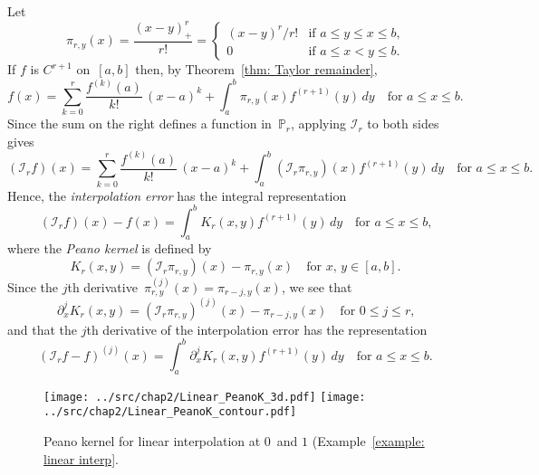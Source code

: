 Let 
\begin{equation}\label{eq: pi r y}
\pi_{r,y}(x)=\frac{(x-y)_+^r}{r!}=\begin{cases}
	(x-y)^r/r!&\text{if $a\le y\le x\le b$,}\\
	0&\text{if $a\le x<y\le b$.}
\end{cases}
\end{equation}
If $f$ is $C^{r+1}$ on~$[a,b]$ then, by Theorem~\ref{thm: Taylor remainder}, 
\[
f(x)=\sum_{k=0}^r\frac{f^{(k)}(a)}{k!}\,(x-a)^k
	+\int_a^b\pi_{r,y}(x)f^{(r+1)}(y)\,dy\quad\text{for $a\le x\le b$.}
\]
Since the sum on the right defines a function in~$\mathbb{P}_r$,
applying $\mathcal{I}_r$ to both sides gives
\[
(\mathcal{I}_rf)(x)=\sum_{k=0}^r\frac{f^{(k)}(a)}{k!}\,(x-a)^k
	+\int_a^b(\mathcal{I}_r\pi_{r,y})(x)f^{(r+1)}(y)\,dy
\quad\text{for $a\le x\le b$.}
\]
Hence, the \emph{interpolation error} has the integral representation
\begin{equation}\label{eq: Qr f error}
(\mathcal{I}_rf)(x)-f(x)=\int_a^b K_r(x,y)f^{(r+1)}(y)\,dy
\quad\text{for $a\le x\le b$,}
\end{equation}
where the \emph{Peano kernel} is defined by
\[
K_r(x,y)=(\mathcal{I}_r\pi_{r,y})(x)-\pi_{r,y}(x)
	\quad\text{for $x$, $y\in[a,b]$.}
\]
Since the $j$th derivative~$\pi_{r,y}^{(j)}(x)=\pi_{r-j,y}(x)$, we see that
\[
\partial_x^jK_r(x,y)=(\mathcal{I}_r\pi_{r,y})^{(j)}(x)-\pi_{r-j,y}(x)
\quad\text{for $0\le j\le r$,}
\]
and that the $j$th derivative of the interpolation error has the representation
\begin{equation}\label{eq: Qr f error deriv}
(\mathcal{I}_rf-f)^{(j)}(x)=\int_a^b\partial_x^j K_r(x,y)f^{(r+1)}(y)\,dy
\quad\text{for $a\le x\le b$.}
\end{equation}


\begin{figure}
\caption{Peano kernel for linear interpolation at $0$~and $1$
(Example~\ref{example: linear interp}.}
\label{fig: linear Peano}
\begin{center}
\texttt{[image: ../src/chap2/Linear\_PeanoK\_3d.pdf]}
\texttt{[image: ../src/chap2/Linear\_PeanoK\_contour.pdf]}
\end{center}
\end{figure}

